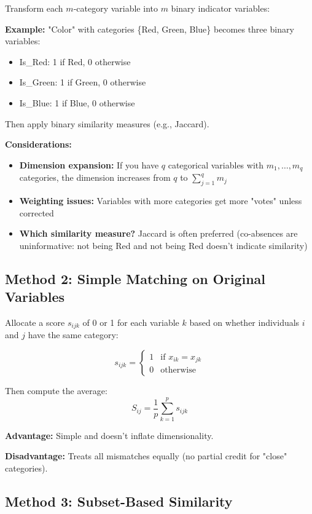 \documentclass[11pt]{article}
\begin{document}
Transform each $m$-category variable into $m$ binary indicator variables:

\textbf{Example:} "Color" with categories \{Red, Green, Blue\} becomes three binary variables:
\begin{itemize}
    \item Is\_Red: 1 if Red, 0 otherwise
    \item Is\_Green: 1 if Green, 0 otherwise
    \item Is\_Blue: 1 if Blue, 0 otherwise
\end{itemize}

Then apply binary similarity measures (e.g., Jaccard).

\textbf{Considerations:}
\begin{itemize}
    \item \textbf{Dimension expansion:} If you have $q$ categorical variables with $m_1, \ldots, m_q$ categories, the dimension increases from $q$ to $\sum_{j=1}^{q} m_j$
    \item \textbf{Weighting issues:} Variables with more categories get more "votes" unless corrected
    \item \textbf{Which similarity measure?} Jaccard is often preferred (co-absences are uninformative: not being Red and not being Red doesn't indicate similarity)
\end{itemize}

\subsection{Method 2: Simple Matching on Original Variables}

Allocate a score $s_{ijk}$ of 0 or 1 for each variable $k$ based on whether individuals $i$ and $j$ have the same category:

$$s_{ijk} = \begin{cases} 1 & \text{if } x_{ik} = x_{jk} \\ 0 & \text{otherwise} \end{cases}$$

Then compute the average:
$$S_{ij} = \frac{1}{p}\sum_{k=1}^{p} s_{ijk}$$

\textbf{Advantage:} Simple and doesn't inflate dimensionality.

\textbf{Disadvantage:} Treats all mismatches equally (no partial credit for "close" categories).

\subsection{Method 3: Subset-Based Similarity}
\end{document}
